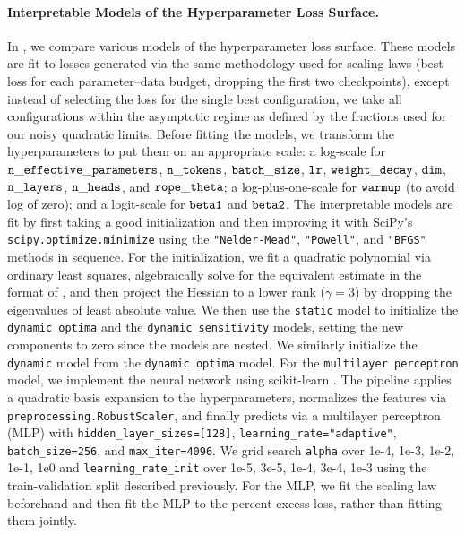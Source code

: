 \paragraph{Interpretable Models of the Hyperparameter Loss Surface.} In , we compare various models of the hyperparameter loss surface. These models are fit to losses generated via the same methodology used for scaling laws (best loss for each parameter--data budget, dropping the first two checkpoints), except instead of selecting the loss for the single best configuration, we take all configurations within the asymptotic regime as defined by the fractions used for our noisy quadratic limits. Before fitting the models, we transform the hyperparameters to put them on an appropriate scale: a log-scale for $\mathtt{n\_effective\_parameters}$, $\mathtt{n\_tokens}$, $\mathtt{batch\_size}$, $\mathtt{lr}$, $\mathtt{weight\_decay}$, $\mathtt{dim}$, $\mathtt{n\_layers}$, $\mathtt{n\_heads}$, and $\mathtt{rope\_theta}$; a log-plus-one-scale for $\mathtt{warmup}$ (to avoid log of zero); and a logit-scale for $\mathtt{beta1}$ and $\mathtt{beta2}$. The interpretable models are fit by first taking a good initialization and then improving it with SciPy's \texttt{scipy.optimize.minimize} using the \texttt{"Nelder-Mead"}, \texttt{"Powell"}, and \texttt{"BFGS"} methods in sequence. For the initialization, we fit a quadratic polynomial via ordinary least squares, algebraically solve for the equivalent estimate in the format of , and then project the Hessian to a lower rank ($\gamma = 3$) by dropping the eigenvalues of least absolute value. We then use the \texttt{static} model to initialize the \texttt{dynamic optima} and the \texttt{dynamic sensitivity} models, setting the new components to zero since the models are nested. We similarly initialize the \texttt{dynamic} model from the \texttt{dynamic optima} model. For the \texttt{multilayer perceptron} model, we implement the neural network using scikit-learn \citep{scikit-learn}. The pipeline applies a quadratic basis expansion to the hyperparameters, normalizes the features via \texttt{preprocessing.RobustScaler}, and finally predicts via a multilayer perceptron (MLP) with \texttt{hidden\_layer\_sizes=[128]}, \texttt{learning\_rate="adaptive"}, \texttt{batch\_size=256}, and \texttt{max\_iter=4096}. We grid search \texttt{alpha} over 1e{-}4, 1e{-}3, 1e{-}2, 1e{-}1, 1e0 and \texttt{learning\_rate\_init} over 1e{-}5, 3e{-}5, 1e{-}4, 3e{-}4, 1e{-}3 using the train-validation split described previously. For the MLP, we fit the scaling law beforehand and then fit the MLP to the percent excess loss, rather than fitting them jointly.

